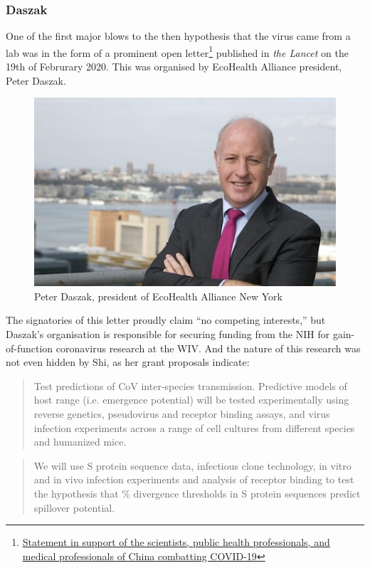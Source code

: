 \documentclass[11pt]{article}
\begin{document}
\subsubsection{Daszak}
\label{sec:org4fc3e16}
One of the first major blows to the then hypothesis that the virus came from a lab was in the form of a prominent open letter\footnote{\href{https://www.thelancet.com/pdfs/journals/lancet/PIIS0140-6736(20)30418-9.pdf}{Statement in support of the scientists, public health professionals, and medical professionals of China combatting COVID-19}} published in \emph{the Lancet} on the 19th of Februrary 2020. This was organised by EcoHealth Alliance president, Peter Daszak.

\begin{figure}[htbp]
\centering
\includegraphics[width=.9\linewidth]{./images/daszak.png}
\caption{Peter Daszak, president of EcoHealth Alliance New York}
\end{figure}

The signatories of this letter proudly claim ``no competing interests,'' but Daszak's organisation is responsible for securing funding from the NIH for gain-of-function coronavirus research at the WIV. And the nature of this research was not even hidden by Shi, as her grant proposals indicate:
\begin{quote}
Test predictions of CoV inter-species transmission. Predictive models of host range (i.e. emergence potential) will be tested experimentally using reverse genetics, pseudovirus and receptor binding assays, and virus infection experiments across a range of cell cultures from different species and humanized mice.
\end{quote}

\begin{quote}
We will use S protein sequence data, infectious clone technology, in vitro and in vivo infection experiments and analysis of receptor binding to test the hypothesis that \% divergence thresholds in S protein sequences predict spillover potential.
\end{quote}
\end{document}
